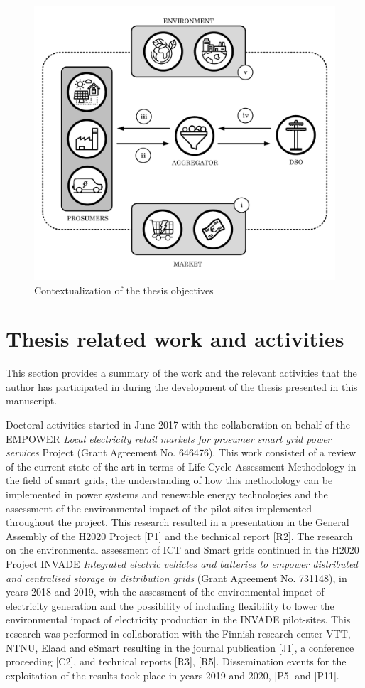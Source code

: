 \begin{figure}[h]
	\centering 
	\includegraphics[width=0.75\columnwidth ]{ChapterIntro/Figures/objectives_figure_2.pdf}
		\caption{Contextualization of the thesis objectives}  
		\label{fig:objectives}
\end{figure}




\newpage 
\section{Thesis related work and activities}
This section provides a summary of the work and the relevant activities that the author has participated in during the development of the thesis presented in this manuscript. 
 	
Doctoral activities started in June 2017 with the collaboration on behalf of the EMPOWER \textit{Local electricity retail markets for prosumer smart grid power services } Project (Grant Agreement No. 646476). This work consisted of a review of the current state of the art in terms of Life Cycle Assessment Methodology in the field of smart grids, the understanding of how this methodology can be implemented in power systems and renewable energy technologies and the assessment of the environmental impact of the pilot-sites implemented throughout the project. This research resulted in a presentation in the General Assembly of the H2020 Project [P1] and the technical report [R2]. The research on the environmental assessment of ICT and Smart grids continued in the H2020 Project INVADE \textit{Integrated electric vehicles and batteries to empower distributed and centralised storage in distribution grids} (Grant Agreement No. 731148), in years  2018 and 2019, with the assessment of the environmental impact of electricity generation and the possibility of including flexibility to lower the environmental impact of electricity production in the INVADE pilot-sites. This research was performed in collaboration with the Finnish research center VTT, NTNU, Elaad and eSmart resulting in the journal publication [J1], a conference proceeding [C2], and technical reports [R3], [R5]. Dissemination events for the exploitation of the results took place in years 2019 and 2020, [P5] and [P11]. 

